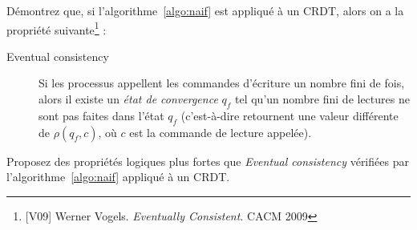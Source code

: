 \begin{exercice}
  \begin{questions}
  \item Démontrez que, si l'algorithme~\ref{algo:naif} est appliqué à un CRDT, alors on a la propriété suivante\footnote{[V09] Werner Vogels. \emph{Eventually Consistent}. CACM 2009} :
  \begin{description}
  \item[Eventual consistency] Si les processus appellent les commandes d'écriture un nombre fini de fois,
    alors il existe un \emph{état de convergence} $q_f$ tel qu'un nombre fini de lectures ne sont pas faites
    dans l'état $q_f$ (c'est-à-dire retournent une valeur différente de $\rho(q_f, c)$, où $c$ est la commande de lecture appelée).
  \end{description}
  \item Proposez des propriétés logiques plus fortes que \emph{Eventual consistency} vérifiées par l'algorithme~\ref{algo:naif} appliqué à un CRDT.
  \end{questions}
\end{exercice}

\endgroup
\endinput
